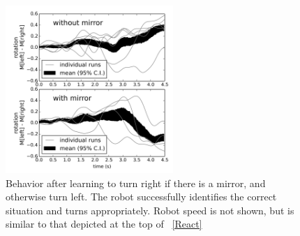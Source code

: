 \documentclass{frontiersSCNS}
\begin{document}
\begin{figure}[h!]
\centering
\includegraphics[width=2.5in]{../figures/learn-mirror/learnmirror.png}
\caption{Behavior after learning to turn right if there is a mirror, and otherwise turn left. The robot successfully identifies the correct situation and turns appropriately. Robot speed is not shown, but is similar to that depicted at the top of \figurename~\ref{React}}
\label{Right}
\end{figure}
\end{document}
